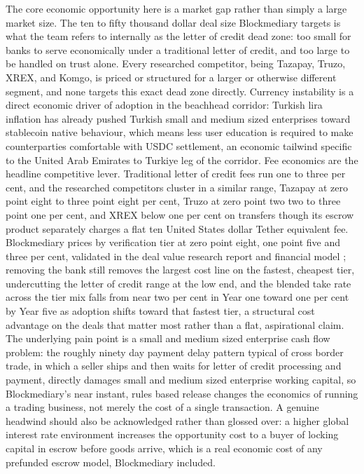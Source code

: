 \documentclass[12pt, a4paper]{article}
\begin{document}
The core economic opportunity here is a market gap rather than simply a large market size.
The ten to fifty thousand dollar deal size Blockmediary targets is what the team refers to
internally as the letter of credit dead zone: too small for banks to serve economically
under a traditional letter of credit, and too large to be handled on trust alone. Every
researched competitor, being Tazapay, Truzo, XREX, and Komgo, is priced or structured for
a larger or otherwise different segment, and none targets this exact dead zone directly.
Currency instability is a direct economic driver of adoption in the beachhead corridor:
Turkish lira inflation has already pushed Turkish small and medium sized enterprises
toward stablecoin native behaviour, which means less user education is required to make
counterparties comfortable with USDC settlement, an economic tailwind specific to the
United Arab Emirates to Turkiye leg of the corridor. Fee economics are the headline
competitive lever. Traditional letter of credit fees run one to three per cent, and the
researched competitors cluster in a similar range, Tazapay at zero point eight to three
point eight per cent, Truzo at zero point two two to three point one per cent, and XREX
below one per cent on transfers though its escrow product separately charges a flat ten
United States dollar Tether equivalent fee. Blockmediary prices by verification tier at
zero point eight, one point five and three per cent, validated in the deal value research
report and financial model \citep{dealvaluereport2026}; removing the bank still removes
the largest cost line on the fastest, cheapest tier, undercutting the letter of credit
range at the low end, and the blended take rate across the tier mix falls from near two
per cent in Year one toward one per cent by Year five as adoption shifts toward that
fastest tier, a structural cost advantage on the deals that matter most rather than a
flat, aspirational claim. The underlying pain point is a small and medium sized enterprise cash
flow problem: the roughly ninety day payment delay pattern typical of cross border trade,
in which a seller ships and then waits for letter of credit processing and payment,
directly damages small and medium sized enterprise working capital, so Blockmediary's near
instant, rules based release changes the economics of running a
trading business, not merely the cost of a single transaction. A genuine headwind should
also be acknowledged rather than glossed over: a higher global interest rate environment
increases the opportunity cost to a buyer of locking capital in escrow before goods arrive,
which is a real economic cost of any prefunded escrow model, Blockmediary included.
\end{document}
